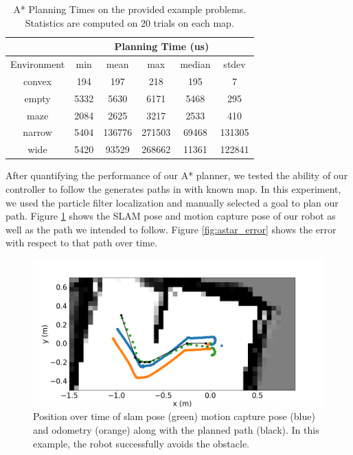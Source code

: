 \documentclass[journal]{IEEEtran}
\begin{document}
            \begin{table}[h]
                \centering
                \begin{tabular}{|c|c|c|c|c|c|} \hline
                    & \multicolumn{5}{c|}{Planning Time (us)} \\ \hline
                    Environment & min & mean & max & median & stdev \\ \hline
                    convex & 194 & 197 & 218 & 195 & 7 \\ \hline
                    empty & 5332 & 5630 & 6171 & 5468 & 295 \\ \hline
                    maze & 2084 & 2625 & 3217 & 2533 & 410 \\ \hline
                    narrow & 5404 & 136776 & 271503 & 69468 & 131305 \\ \hline
                    wide & 5420 & 93529 & 268662 & 11361 & 122841 \\ \hline
                \end{tabular}
                \caption{A* Planning Times on the provided example problems. Statistics are computed on 20 trials on each map.}
                \label{tab:a_star_times}
            \end{table}
        
            After quantifying the performance of our A* planner, we tested the ability of our controller to follow the generates paths in with known map. In this experiment, we used the particle filter localization and manually selected a goal to plan our path. Figure \ref{fig:astar} shows the SLAM pose and motion capture pose of our robot as well as the path we intended to follow. Figure \ref{fig:astar_error} shows the error with respect to that path over time. 
            
            \begin{figure}[h]
                \centering
                \includegraphics[width=1\linewidth]{astar.png}
                \caption{Position over time of slam pose (green) motion capture pose (blue) and odometry (orange) along with the planned path (black). In this example, the robot successfully avoids the obstacle.}
                \label{fig:astar}
            \end{figure}
            
\end{document}
